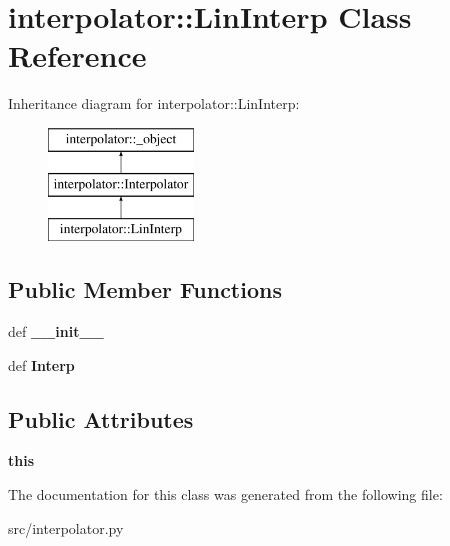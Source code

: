 \hypertarget{classinterpolator_1_1LinInterp}{
\section{interpolator::LinInterp Class Reference}
\label{df/d7e/classinterpolator_1_1LinInterp}
}
Inheritance diagram for interpolator::LinInterp:\begin{figure}[H]
\begin{center}
\leavevmode
\includegraphics[height=3cm]{df/d7e/classinterpolator_1_1LinInterp}
\end{center}
\end{figure}
\subsection*{Public Member Functions}
\begin{DoxyCompactItemize}
\item 
\hypertarget{classinterpolator_1_1LinInterp_aa9f273599a1e0558c90d0483e9d05e73}{
def {\bfseries \_\-\_\-init\_\-\_\-}}
\label{df/d7e/classinterpolator_1_1LinInterp_aa9f273599a1e0558c90d0483e9d05e73}

\item 
\hypertarget{classinterpolator_1_1LinInterp_a397581a63f3406289ffddb9fbc83538b}{
def {\bfseries Interp}}
\label{df/d7e/classinterpolator_1_1LinInterp_a397581a63f3406289ffddb9fbc83538b}

\end{DoxyCompactItemize}
\subsection*{Public Attributes}
\begin{DoxyCompactItemize}
\item 
\hypertarget{classinterpolator_1_1LinInterp_a3512f4d431e4c275621dc18956cde58a}{
{\bfseries this}}
\label{df/d7e/classinterpolator_1_1LinInterp_a3512f4d431e4c275621dc18956cde58a}

\end{DoxyCompactItemize}


The documentation for this class was generated from the following file:\begin{DoxyCompactItemize}
\item 
src/interpolator.py\end{DoxyCompactItemize}
